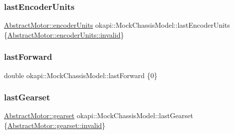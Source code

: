 \mbox{\label{classokapi_1_1MockChassisModel_aa31360d4d2551b1b6b595a9546136876}} 
\subsubsection{\texorpdfstring{lastEncoderUnits}{lastEncoderUnits}}
{\footnotesize\ttfamily \mbox{\hyperlink{classokapi_1_1AbstractMotor_ae811cd825099f2defadeb1b7f7e7764c}{Abstract\+Motor\+::encoder\+Units}} okapi\+::\+Mock\+Chassis\+Model\+::last\+Encoder\+Units \{\mbox{\hyperlink{classokapi_1_1AbstractMotor_ae811cd825099f2defadeb1b7f7e7764cafedb2d84cafe20862cb4399751a8a7e3}{Abstract\+Motor\+::encoder\+Units\+::invalid}}\}\hspace{0.3cm}{\ttfamily [mutable]}}

\mbox{\label{classokapi_1_1MockChassisModel_a4f469a4c1aa7c6d42bb9f86e3ca07e73}} 
\subsubsection{\texorpdfstring{lastForward}{lastForward}}
{\footnotesize\ttfamily double okapi\+::\+Mock\+Chassis\+Model\+::last\+Forward \{0\}\hspace{0.3cm}{\ttfamily [mutable]}}

\mbox{\label{classokapi_1_1MockChassisModel_a5425e4b068b6a855eebf2e338250b645}} 
\subsubsection{\texorpdfstring{lastGearset}{lastGearset}}
{\footnotesize\ttfamily \mbox{\hyperlink{classokapi_1_1AbstractMotor_a88aaa6ea2fa10f5520a537bbf26774d5}{Abstract\+Motor\+::gearset}} okapi\+::\+Mock\+Chassis\+Model\+::last\+Gearset \{\mbox{\hyperlink{classokapi_1_1AbstractMotor_a88aaa6ea2fa10f5520a537bbf26774d5afedb2d84cafe20862cb4399751a8a7e3}{Abstract\+Motor\+::gearset\+::invalid}}\}\hspace{0.3cm}{\ttfamily [mutable]}}

